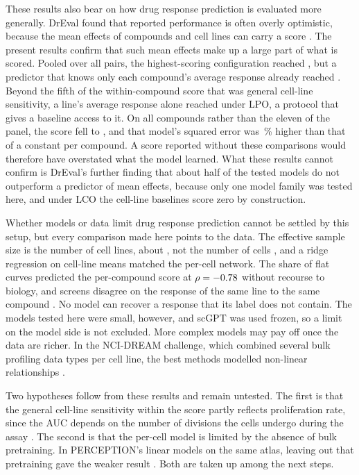 These results also bear on how drug response prediction is evaluated more generally. DrEval found that
reported performance is often overly optimistic, because the mean effects of compounds and cell lines
can carry a score \cite{dreval}. The present results confirm that such mean effects make up a large part
of what is scored. Pooled over all pairs, the highest-scoring configuration reached \SpPooled{}, but a
predictor that knows only each compound's average response already reached \SpDrugMeanPooled{}. Beyond
the fifth of the within-compound score that was general cell-line sensitivity, a line's average
response alone reached \LpoLineMean{} under LPO, a protocol that gives a baseline access to it. On all \NDrugsModelled{}
compounds rather than the eleven of the panel, the score fell to \SpAllDrugs{}, and that model's squared
error was \HdRiseLinPca\,\% higher than that of a constant per compound. A score reported without these
comparisons would therefore have overstated what the model learned. What these results cannot confirm
is DrEval's further finding that about half of the tested models do not outperform a predictor of mean
effects, because only one model family was tested here, and under LCO the cell-line baselines score
zero by construction.

Whether models or data limit drug response prediction cannot be settled by this setup, but every
comparison made here points to the data. The effective sample size is the number of cell lines, about
\NLinesCV{}, not the number of cells \cite{lazic2010}, and a ridge regression on cell-line means matched
the per-cell network. The share of flat curves predicted the per-compound score at $\rho = -0.78{}$
without recourse to biology, and screens disagree on the response of the same line to the same compound
\cite{haibekains2013,safikhani2017}. No model can recover a response that its label does not contain.
The models tested here were small, however, and scGPT was used frozen, so a limit on the model side is
not excluded. More complex models may pay off once the data are richer. In the NCI-DREAM challenge,
which combined several bulk profiling data types per cell line, the best methods modelled non-linear
relationships \cite{costello2014}.

Two hypotheses follow from these results and remain untested. The first is that the general cell-line
sensitivity within the score partly reflects proliferation rate, since the AUC depends on the number of
divisions the cells undergo during the assay \cite{hafner}. The second is that the per-cell model is
limited by the absence of bulk pretraining. In PERCEPTION's linear models on the same atlas, leaving
out that pretraining gave the weaker result \cite{perception}. Both are taken up among the next steps.

